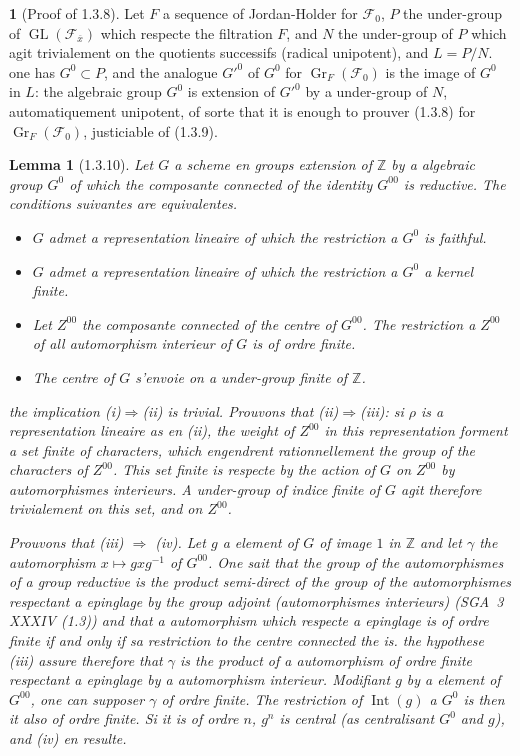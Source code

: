 \documentclass[12pt,a4paper]{article}
\theoremstyle{plain}
\newtheorem{lemma}[theorem]{Lemma}
\theoremstyle{definition}
\theoremstyle{definition}
\newtheorem{para}{}[section]
\theoremstyle{remark}
\DeclareMathOperator{\GL}{GL}
\DeclareMathOperator{\Gr}{Gr}
\DeclareMathOperator{\Int}{Int}
\begin{document}
\begin{para}[Proof of 1.3.8]
Let $F$ a sequence of Jordan-Holder for $\mathscr{F}_0$, $P$ the under-group of $\GL(\mathscr{F}_{\overline{x}})$ which respecte the filtration $F$, and $N$ the under-group of $P$ which agit trivialement on the quotients successifs (radical unipotent), and $L = P/N$. one has $G^0 \subset P$, and the analogue $G'^0$ of $G^0$ for $\Gr_F(\mathscr{F}_0)$ is the image of $G^0$ in $L$: the algebraic group $G^0$ is extension of $G'^0$ by a under-group of $N$, automatiquement unipotent, of sorte that it is enough to prouver (1.3.8) for $\Gr_F(\mathscr{F}_0)$, justiciable of (1.3.9).
\end{para}

\begin{lemma}[1.3.10]
Let $G$ a scheme en groups extension of $\mathbb{Z}$ by a algebraic group $G^0$ of which the composante connected of the identity $G^{00}$ is reductive. The conditions suivantes are equivalentes.
\begin{itemize}[nosep]
\item[(i)] $G$ admet a representation lineaire of which the restriction a $G^0$ is faithful.
\item[(ii)] $G$ admet a representation lineaire of which the restriction a $G^0$ a kernel finite.
\item[(iii)] Let $Z^{00}$ the composante connected of the centre of $G^{00}$. The restriction a $Z^{00}$ of all automorphism interieur of $G$ is of ordre finite.
\item[(iv)] The centre of $G$ s'envoie on a under-group finite of $\mathbb{Z}$.
\end{itemize}

the implication (i)$\Rightarrow$(ii) is trivial. Prouvons that (ii)$\Rightarrow$(iii): si $\rho$ is a representation lineaire as en (ii), the weight of $Z^{00}$ in this representation forment a set finite of characters, which engendrent rationnellement the group of the characters of $Z^{00}$. This set finite is respecte by the action of $G$ on $Z^{00}$ by automorphismes interieurs. A under-group of indice finite of $G$ agit therefore trivialement on this set, and on $Z^{00}$.

Prouvons that (iii) $\Rightarrow$ (iv). Let $g$ a element of $G$ of image $1$ in $\mathbb{Z}$ and let $\gamma$ the automorphism $x \mapsto gxg^{-1}$ of $G^{00}$. One sait that the group of the automorphismes of a group reductive is the product semi-direct of the group of the automorphismes respectant a epinglage by the group adjoint (automorphismes interieurs) (SGA~3 XXXIV (1.3)) and that a automorphism which respecte a epinglage is of ordre finite if and only if sa restriction to the centre connected the is. the hypothese (iii) assure therefore that $\gamma$ is the product of a automorphism of ordre finite respectant a epinglage by a automorphism interieur. Modifiant $g$ by a element of $G^{00}$, one can supposer $\gamma$ of ordre finite. The restriction of $\Int(g)$ a $G^0$ is then it also of ordre finite. Si it is of ordre $n$, $g^n$ is central (as centralisant $G^0$ and $g$), and (iv) en resulte.


\end{lemma}
\end{document}
